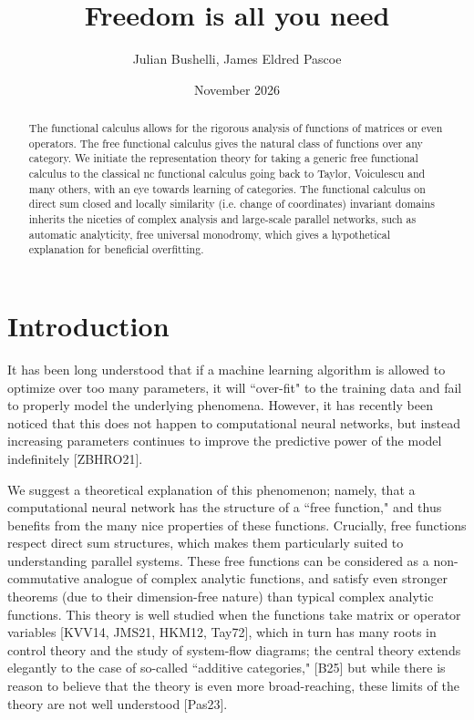 \documentclass[12pt]{amsart}
\title{Freedom is all you need}
\author{Julian Bushelli, James Eldred Pascoe}
\date{November 2026}
\theoremstyle{definition}
\numberwithin{equation}{section}
\begin{document}
\begin{abstract}
    
The functional calculus allows for the rigorous analysis of functions of matrices or even operators. The free functional calculus gives the natural class of functions over any category. We initiate the representation theory for taking a generic free functional calculus to the classical nc functional calculus going back to Taylor, Voiculescu and many others, with an eye towards learning of categories. The functional calculus on direct sum closed and locally similarity (i.e. change of coordinates) invariant domains inherits the niceties of complex analysis and large-scale parallel networks, such as automatic analyticity, free universal monodromy, which gives a hypothetical explanation for beneficial overfitting. 
\end{abstract}
\maketitle


\section{Introduction}

It has been long understood that if a machine learning algorithm is allowed to optimize over too many parameters, it will ``over-fit" to the training data and fail to properly model the underlying phenomena. However, it has recently been noticed that this does not happen to computational neural networks, but instead increasing parameters continues to improve the predictive power of the model indefinitely [ZBHRO21]. 

We suggest a theoretical explanation of this phenomenon; namely, that a computational neural network has the structure of a ``free function," and thus benefits from the many nice properties of these functions. Crucially, free functions respect direct sum structures, which makes them particularly suited to understanding parallel systems. These free functions can be considered as a non-commutative analogue of complex analytic functions, and satisfy even stronger theorems (due to their dimension-free nature) than typical complex analytic functions.  This theory is well studied when the functions take matrix or operator variables [KVV14, JMS21, HKM12, Tay72], which in turn has many roots in control theory and the study of system-flow diagrams; the central theory extends elegantly to the case of so-called ``additive categories," [B25] but while there is reason to believe that the theory is even more broad-reaching, these limits of the theory are not well understood [Pas23]. 
\end{document}
